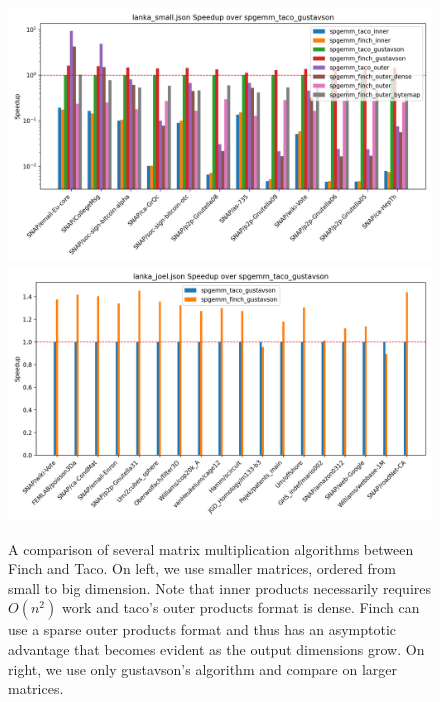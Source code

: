 





\begin{figure}
    \label{fig:spgemm}
	\includegraphics[width=0.5\linewidth]{spgemm_small_speedup_log_scale.png}%
	\includegraphics[width=0.5\linewidth]{spgemm_joel_speedup.png}
    \caption{A comparison of several matrix multiplication algorithms between
    Finch and Taco. On left, we use smaller matrices, ordered from small to big
    dimension. Note that inner products necessarily requires $O(n^2)$ work and
    taco's outer products format is dense. Finch can use a sparse outer products
    format and thus has an asymptotic advantage that becomes evident as the
    output dimensions grow. On right, we use only gustavson's algorithm and compare on larger matrices.}
\end{figure}

